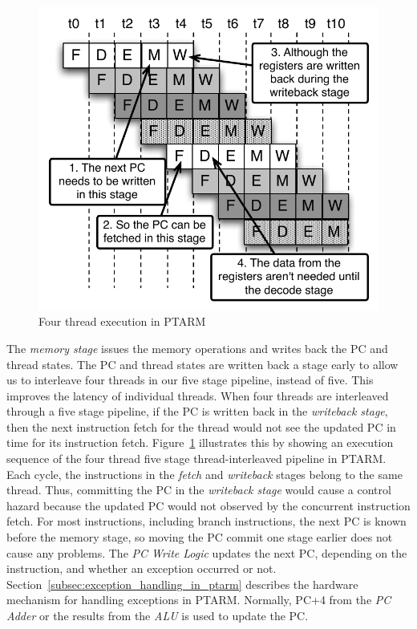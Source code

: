 \begin{figure}
  \vspace{-20pt}
  \begin{center}
    \includegraphics[scale=.65]{figs/four_thread_pipeline}
  \end{center}
  \vspace{-3mm}
  \caption{Four thread execution in PTARM}
  \label{fig:four_thread_pipeline}
  \vspace{-10pt}
\end{figure}      
     
The \emph{memory stage} issues the memory operations and writes back the PC and thread states.
The PC and thread states are written back a stage early to allow us to interleave four threads in our five stage pipeline, instead of five.
This improves the latency of individual threads. 
When four threads are interleaved through a five stage pipeline, if the PC is written back in the \emph{writeback stage}, then the next instruction fetch for the thread would not see the updated PC in time for its instruction fetch. 
Figure~\ref{fig:four_thread_pipeline} illustrates this by showing an execution sequence of the four thread five stage thread-interleaved pipeline in PTARM.
Each cycle, the instructions in the \emph{fetch} and \emph{writeback} stages belong to the same thread.
Thus, committing the PC in the \emph{writeback stage} would cause a control hazard because the updated PC would not observed by the concurrent instruction fetch.
For most instructions, including branch instructions, the next PC is known before the memory stage, so moving the PC commit one stage earlier does not cause any problems.  
The \emph{PC Write Logic} updates the next PC, depending on the instruction, and whether an exception occurred or not.
Section~\ref{subsec:exception_handling_in_ptarm} describes the hardware mechanism for handling exceptions in PTARM. 
Normally, PC+4 from the \emph{PC Adder} or the results from the \emph{ALU} is used to update the PC.

